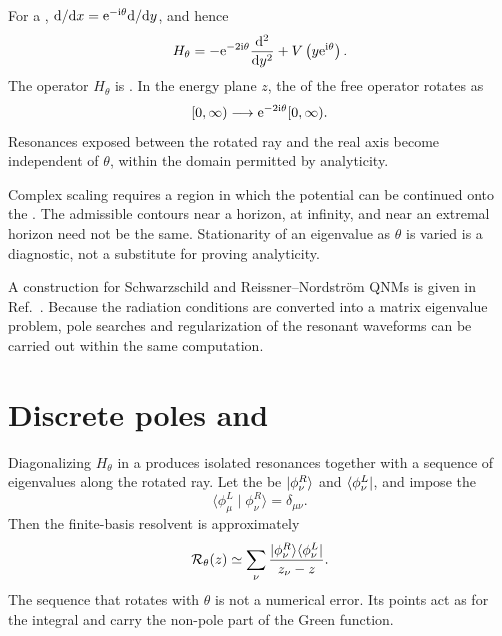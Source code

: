 For a , $\mathrm{d}/\mathrm{d} x=\mathrm{e}^{-\mathrm{i}\theta}\mathrm{d}/\mathrm{d} y$, and hence
\begin{equation}
H_\theta
=
-\mathrm{e}^{-2\mathrm{i}\theta}
\frac{\mathrm{d}^2}{\mathrm{d} y^2}
+V\left(y\mathrm{e}^{\mathrm{i}\theta}\right).
\label{eq:complex-scaled-hamiltonian}
\end{equation}
The operator $H_\theta$ is . In the energy plane $z$, the  of the free operator rotates as
\begin{equation}
[0,\infty)
\longrightarrow
\mathrm{e}^{-2\mathrm{i}\theta}[0,\infty).
\label{eq:rotated-continuum}
\end{equation}
Resonances exposed between the rotated ray and the real axis become  independent of $\theta$, within the domain permitted by analyticity.

\begin{warningbox}
Complex scaling requires a region in which the potential can be continued onto the . The admissible contours near a horizon, at infinity, and near an extremal horizon need not be the same. Stationarity of an eigenvalue as $\theta$ is varied is a diagnostic, not a substitute for proving analyticity.
\end{warningbox}

A construction for Schwarzschild and Reissner--Nordstr\"om QNMs is given in Ref.~\cite{Ogawa:2026veu}. Because the radiation conditions are converted into a matrix eigenvalue problem, pole searches and regularization of the resonant waveforms can be carried out within the same computation.

\section{Discrete poles and }

Diagonalizing $H_\theta$ in a  produces isolated resonances together with a sequence of eigenvalues along the rotated ray. Let the  be $\lvert \phi^R_\nu \rangle$ and $\langle \phi^L_\nu \rvert$, and impose the 
\begin{equation}
\langle\phi^L_\mu\mid\phi^R_\nu\rangle
=
\delta_{\mu\nu}.
\end{equation}
Then the finite-basis resolvent is approximately
\begin{equation}
\mathcal{R}_\theta(z)
\simeq
\sum_\nu
\frac{
\lvert \phi^R_\nu \rangle\langle \phi^L_\nu \rvert
}{
z_\nu-z
}.
\label{eq:csm-finite-resolvent}
\end{equation}
The sequence that rotates with $\theta$ is not a numerical error. Its points act as  for the  integral and carry the non-pole part of the Green function.

